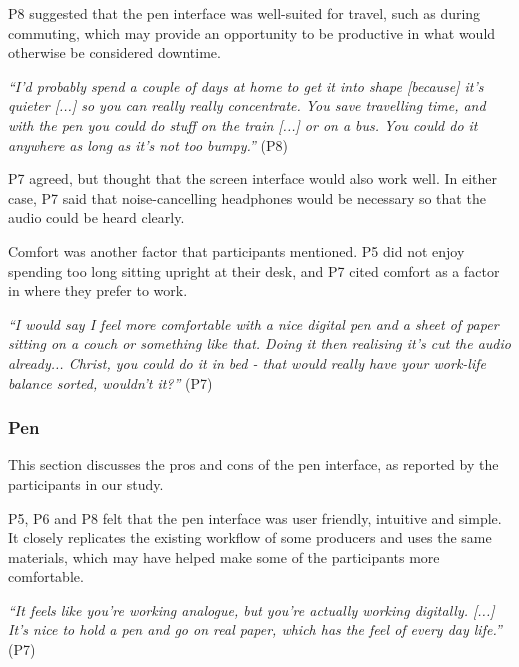 P8 suggested that the pen interface was well-suited for travel, such as during commuting, which may provide an
opportunity to be productive in what would otherwise be considered downtime.

\textit{``I'd probably spend a couple of days at home to get it into shape [because] it's quieter [...]
  so you can really really concentrate. You save travelling time, and with the pen you could do stuff on the train [...]
  or on a bus. You could do it anywhere as long as it's not too bumpy.''} (P8)

P7 agreed, but thought that the screen interface would also work well. In either case, P7 said that noise-cancelling
headphones would be necessary so that the audio could be heard clearly.

Comfort was another factor that participants mentioned. P5 did not enjoy spending too long sitting upright at their
desk, and P7 cited comfort as a factor in where they prefer to work.

\textit{``I would say I feel more comfortable with a nice digital pen and a sheet of paper sitting on a couch or
something like that. Doing it then realising it's cut the audio already... Christ, you could do it in bed - that would
really have your work-life balance sorted, wouldn't it?''} (P7)

\subsubsection{Pen}

This section discusses the pros and cons of the pen interface, as reported by the participants in our study.


P5, P6 and P8 felt that the pen interface was user friendly, intuitive and simple. It closely replicates the existing
workflow of some producers and uses the same materials, which may have helped make some of the participants more
comfortable.

\textit{``It feels like you're working analogue, but you're actually working digitally. [...] It's nice to hold a pen
and go on real paper, which has the feel of every day life.''} (P7)

